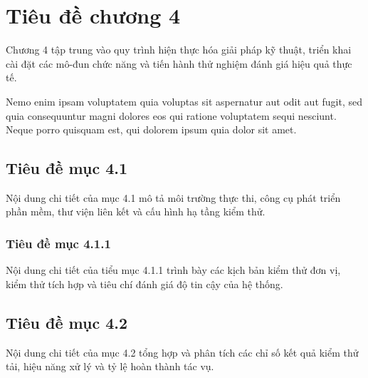 
\chapter{Tiêu đề chương 4}
\label{chap:chapter_4}

Chương 4 tập trung vào quy trình hiện thực hóa giải pháp kỹ thuật, triển khai cài đặt các mô-đun chức năng và tiến hành thử nghiệm đánh giá hiệu quả thực tế.

Nemo enim ipsam voluptatem quia voluptas sit aspernatur aut odit aut fugit, sed quia consequuntur magni dolores eos qui ratione voluptatem sequi nesciunt. Neque porro quisquam est, qui dolorem ipsum quia dolor sit amet.

\section{Tiêu đề mục 4.1}
\label{sec:section_4_1}

Nội dung chi tiết của mục 4.1 mô tả môi trường thực thi, công cụ phát triển phần mềm, thư viện liên kết và cấu hình hạ tầng kiểm thử.

\subsection{Tiêu đề mục 4.1.1}
\label{subsec:subsection_4_1_1}

Nội dung chi tiết của tiểu mục 4.1.1 trình bày các kịch bản kiểm thử đơn vị, kiểm thử tích hợp và tiêu chí đánh giá độ tin cậy của hệ thống.

\section{Tiêu đề mục 4.2}
\label{sec:section_4_2}

Nội dung chi tiết của mục 4.2 tổng hợp và phân tích các chỉ số kết quả kiểm thử tải, hiệu năng xử lý và tỷ lệ hoàn thành tác vụ.
